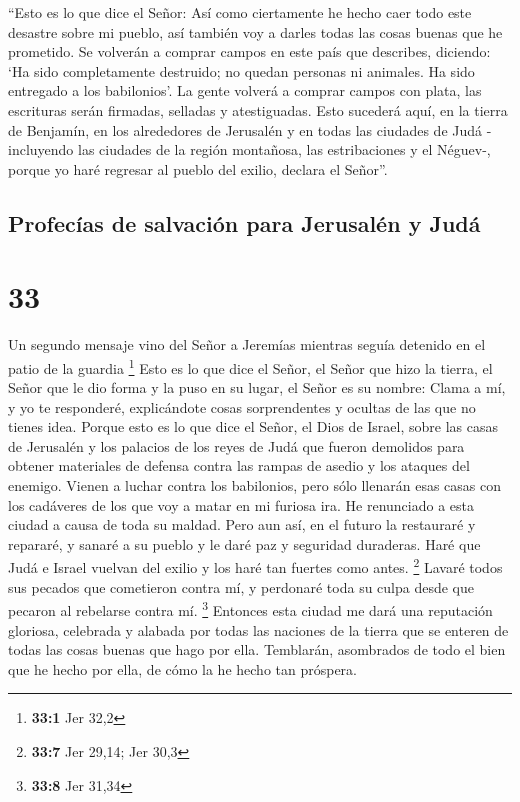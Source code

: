  ``Esto es lo que dice el Señor: Así como ciertamente he
hecho caer todo este desastre sobre mi pueblo, así también voy a darles
todas las cosas buenas que he prometido.  Se volverán a
comprar campos en este país que describes, diciendo: `Ha sido
completamente destruido; no quedan personas ni animales. Ha sido
entregado a los babilonios'.  La gente volverá a comprar
campos con plata, las escrituras serán firmadas, selladas y
atestiguadas. Esto sucederá aquí, en la tierra de Benjamín, en los
alrededores de Jerusalén y en todas las ciudades de Judá -incluyendo las
ciudades de la región montañosa, las estribaciones y el Néguev-, porque
yo haré regresar al pueblo del exilio, declara el Señor''.

\hypertarget{profecuxedas-de-salvaciuxf3n-para-jerusaluxe9n-y-juduxe1}{%
\subsection{Profecías de salvación para Jerusalén y
Judá}\label{profecuxedas-de-salvaciuxf3n-para-jerusaluxe9n-y-juduxe1}}

\hypertarget{section-32}{%
\section{33}\label{section-32}}

 Un segundo mensaje vino del Señor a Jeremías mientras
seguía detenido en el patio de la guardia \footnote{\textbf{33:1} Jer
  32,2}  Esto es lo que dice el Señor, el Señor que hizo
la tierra, el Señor que le dio forma y la puso en su lugar, el Señor es
su nombre:  Clama a mí, y yo te responderé, explicándote
cosas sorprendentes y ocultas de las que no tienes idea. 
Porque esto es lo que dice el Señor, el Dios de Israel, sobre las casas
de Jerusalén y los palacios de los reyes de Judá que fueron demolidos
para obtener materiales de defensa contra las rampas de asedio y los
ataques del enemigo.  Vienen a luchar contra los
babilonios, pero sólo llenarán esas casas con los cadáveres de los que
voy a matar en mi furiosa ira. He renunciado a esta ciudad a causa de
toda su maldad.  Pero aun así, en el futuro la restauraré
y repararé, y sanaré a su pueblo y le daré paz y seguridad duraderas.
 Haré que Judá e Israel vuelvan del exilio y los haré tan
fuertes como antes. \footnote{\textbf{33:7} Jer 29,14; Jer 30,3}
 Lavaré todos sus pecados que cometieron contra mí, y
perdonaré toda su culpa desde que pecaron al rebelarse contra mí.
\footnote{\textbf{33:8} Jer 31,34}  Entonces esta ciudad
me dará una reputación gloriosa, celebrada y alabada por todas las
naciones de la tierra que se enteren de todas las cosas buenas que hago
por ella. Temblarán, asombrados de todo el bien que he hecho por ella,
de cómo la he hecho tan próspera.

